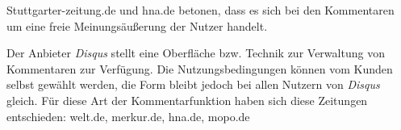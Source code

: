 Stuttgarter-zeitung.de und hna.de betonen, dass es sich bei den Kommentaren um eine freie 
Meinungsäußerung der Nutzer handelt. 

Der Anbieter {\slshape Disqus} stellt eine Oberfläche bzw. Technik zur Verwaltung von Kommentaren zur Verfügung. 
Die Nutzungsbedingungen können vom Kunden selbst gewählt werden, die Form bleibt jedoch 
bei allen Nutzern von {\slshape Disqus} gleich. Für diese Art der Kommentarfunktion haben sich diese
Zeitungen entschieden: welt.de, merkur.de, hna.de, mopo.de












